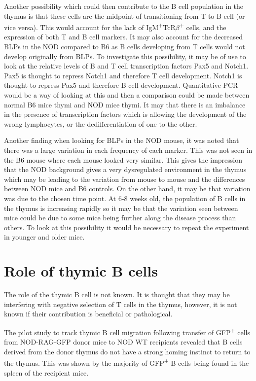 Another possibility which could then contribute to the B cell population in the thymus is that these cells are the midpoint of transitioning from T to B cell (or vice versa).
This would account for the lack of IgM\textsuperscript{+}TcR$\beta$\textsuperscript{+} cells, and the expression of both T and B cell markers.
It may also account for the decreased BLPs in the NOD compared to B6 as B cells developing from T cells would not develop originally from BLPs.
To investigate this possibility, it may be of use to look at the relative levels of B and T cell transcription factors Pax5 and Notch1.
Pax5 is thought to repress Notch1 and therefore T cell development.
Notch1 is thought to repress Pax5 and therefore B cell development.
Quantitative PCR would be a way of looking at this and then a comparison could be made between normal B6 mice thymi and NOD mice thymi.
It may that there is an imbalance in the presence of transcription factors which is allowing the development of the wrong lymphocytes, or the dedifferentiation of one to the other.

Another finding when looking for BLPs in the NOD mouse, it was noted that there was a large variation in each frequency of each marker.
This was not seen in the B6 mouse where each mouse looked very similar.
This gives the impression that the NOD background gives a very dysregulated environment in the thymus which may be leading to the variation from mouse to mouse and the differences between NOD mice and B6 controls.
On the other hand, it may be that variation was due to the chosen time point. 
At 6-8 weeks old, the population of B cells in the thymus is increasing rapidly so it may be that the variation seen between mice could be due to some mice being further along the disease process than others.
To look at this possibility it would be necessary to repeat the experiment in younger and older mice.



\section{Role of thymic B cells}

The role of the thymic B cell is not known.
It is thought that they may be interfering with negative selection of T cells in the thymus, however, it is not known if their contribution is beneficial or pathological.

The pilot study to track thymic B cell migration following transfer of GFP\textsuperscript{+} cells from NOD-RAG-GFP donor mice to NOD WT recipients revealed that B cells derived from the donor thymus do not have a strong homing instinct to return to the thymus.
This was shown by the majority of GFP\textsuperscript{+} B cells being found in the spleen of the recipient mice.

